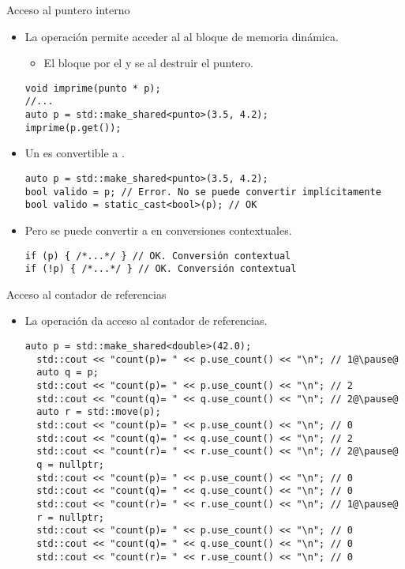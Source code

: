 \begin{frame}[t,fragile]{Acceso al puntero interno}
\begin{itemize}
  \item La operación  permite acceder al 
        al bloque de memoria dinámica.
    \begin{itemize}
      \item El bloque  por el  y
            se  al destruir el puntero.
    \end{itemize}
\begin{lstlisting}
void imprime(punto * p);
//...
auto p = std::make_shared<punto>(3.5, 4.2);
imprime(p.get());
\end{lstlisting}

  \item Un  es  convertible a .
\begin{lstlisting}
auto p = std::make_shared<punto>(3.5, 4.2);
bool valido = p; // Error. No se puede convertir implícitamente
bool valido = static_cast<bool>(p); // OK
\end{lstlisting}

  \item Pero se puede convertir  a 
        en conversiones contextuales.
\begin{lstlisting}
if (p) { /*...*/ } // OK. Conversión contextual
if (!p) { /*...*/ } // OK. Conversión contextual
\end{lstlisting}

\end{itemize}
\end{frame}

\begin{frame}[t,fragile]{Acceso al contador de referencias}
\begin{itemize}
  \item La operación  da acceso al contador de referencias.

\begin{lstlisting}[escapechar=@]
  auto p = std::make_shared<double>(42.0);
  std::cout << "count(p)= " << p.use_count() << "\n"; // 1@\pause@
  auto q = p;
  std::cout << "count(p)= " << p.use_count() << "\n"; // 2
  std::cout << "count(q)= " << q.use_count() << "\n"; // 2@\pause@
  auto r = std::move(p);
  std::cout << "count(p)= " << p.use_count() << "\n"; // 0
  std::cout << "count(q)= " << q.use_count() << "\n"; // 2
  std::cout << "count(r)= " << r.use_count() << "\n"; // 2@\pause@
  q = nullptr;
  std::cout << "count(p)= " << p.use_count() << "\n"; // 0
  std::cout << "count(q)= " << q.use_count() << "\n"; // 0
  std::cout << "count(r)= " << r.use_count() << "\n"; // 1@\pause@
  r = nullptr;
  std::cout << "count(p)= " << p.use_count() << "\n"; // 0
  std::cout << "count(q)= " << q.use_count() << "\n"; // 0
  std::cout << "count(r)= " << r.use_count() << "\n"; // 0
\end{lstlisting}
\end{itemize}
\end{frame}

